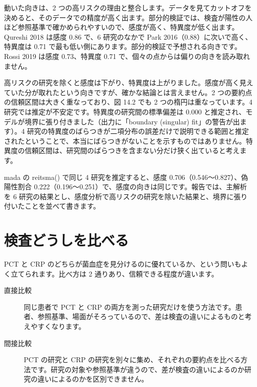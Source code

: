 
動いた向きは、2 つの高リスクの理由と整合します。データを見てカットオフを決めると、そのデータでの精度が高く出ます。部分的検証では、検査が陽性の人ほど参照基準で確かめられやすいので、感度が高く、特異度が低く出ます。Qureshi 2018 は感度 0.86 で、6 研究のなかで Park 2016（0.88）に次いで高く、特異度は 0.71 で最も低い側にあります。部分的検証で予想される向きです。Rossi 2019 は感度 0.73、特異度 0.71 で、個々の点からは偏りの向きを読み取れません。

高リスクの研究を除くと感度は下がり、特異度は上がりました。感度が高く見えていた分が取れたという向きですが、確かな結論とは言えません。2 つの要約点の信頼区間は大きく重なっており、図 14.2 でも 2 つの楕円は重なっています。4 研究では推定が不安定です。特異度の研究間の標準偏差は 0.000 と推定され、モデルが境界に張り付きました（出力に「boundary (singular) fit」の警告が出ます）。4 研究の特異度のばらつきが二項分布の誤差だけで説明できる範囲と推定されたということで、本当にばらつきがないことを示すものではありません。特異度の信頼区間は、研究間のばらつきを含まない分だけ狭く出ていると考えます。

mada の reitsma() で同じ 4 研究を推定すると、感度 0.706（0.546〜0.827）、偽陽性割合 0.222（0.196〜0.251）で、感度の向きは同じです。報告では、主解析を 6 研究の結果とし、感度分析で高リスクの研究を除いた結果と、境界に張り付いたことを並べて書きます。

\section{\hatten 検査どうしを比べる}
\label{sec:14-6}

PCT と CRP のどちらが菌血症を見分けるのに優れているか、という問いもよく立てられます。比べ方は 2 通りあり、信頼できる程度が違います。

\begin{description}
\item[直接比較] 同じ患者で PCT と CRP の両方を測った研究だけを使う方法です。患者、参照基準、場面がそろっているので、差は検査の違いによるものと考えやすくなります。
\item[間接比較] PCT の研究と CRP の研究を別々に集め、それぞれの要約点を比べる方法です。研究の対象や参照基準が違うので、差が検査の違いによるのか研究の違いによるのかを区別できません。
\end{description}

